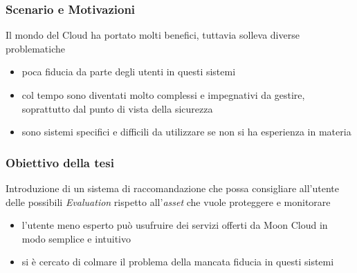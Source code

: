 \frame{\titlepage}

\begin{frame}
    \frametitle{Scenario e Motivazioni}
    Il mondo del Cloud ha portato molti benefici, tuttavia solleva diverse problematiche
    \begin{itemize}
        \item \alert{poca fiducia} da parte degli utenti in questi sistemi
        \item col tempo sono diventati molto \alert{complessi e impegnativi da gestire}, soprattutto dal punto di vista della sicurezza
        \item sono sistemi specifici e \alert{difficili da utilizzare} se non si ha esperienza in materia
    \end{itemize}
\end{frame}

\begin{frame}
    \frametitle{Obiettivo della tesi}
    Introduzione di un \alert{sistema di raccomandazione} che possa consigliare all'utente delle possibili \textit{Evaluation} rispetto 
    all'\textit{asset} che vuole proteggere e monitorare
    \begin{itemize}
        \item l'utente meno esperto può usufruire dei servizi offerti da Moon Cloud in modo \alert{semplice} e \alert{intuitivo}
        \item si è cercato di colmare il problema della mancata fiducia in questi sistemi
    \end{itemize}
\end{frame}

